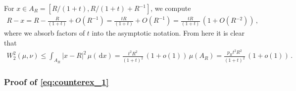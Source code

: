 \documentclass[12pt]{article}
\newcommand{\1}{\mathds{1}}
\newcommand*{\rd}{\mathrm{d}}
\newcommand*{\dd}{\, \rd}
\renewcommand{\leq}{\leqslant}
\theoremstyle{plain}
\theoremstyle{definition}
\theoremstyle{remark}
\begin{document}
For $x \in A_R = [R/(1+t), R/(1+t) + R^{-1}]$, we compute
\begin{align*}
    R - x = R - \frac{R}{(1+t)} + O(R^{-1}) = \frac{tR}{(1+t)} + O(R^{-1}) = \frac{tR}{(1+t)}\,(1 + O(R{^{-2}}))\,,
\end{align*}
where we absorb factors of $t$ into the asymptotic notation. From here it is clear that
\begin{align*}
    W_2^2(\mu,\nu) \leq \int_{A_R}|x-R|^2 \,\mu(\!\dd x) = \frac{t^2R^2}{(1+t)^2}\,(1+o(1))\,\mu(A_R) = \frac{p_R t^2 R^2}{(1+t)^2}\,(1+o(1))\,.
\end{align*}


\subsubsection{Proof of \texorpdfstring{\eqref{eq:counterex_1}}{the second estimate}}
\end{document}
